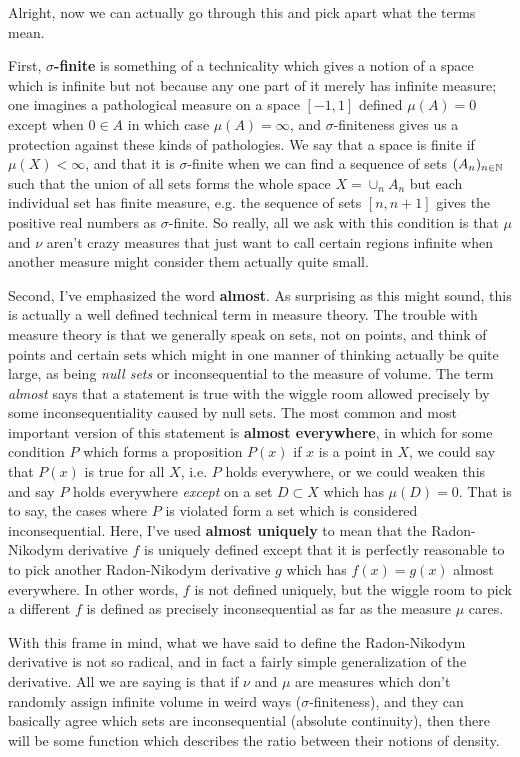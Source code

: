 \documentclass[11pt]{article}
\begin{document}
Alright, now we can actually go through this and pick apart what the terms mean.

First, $\sigma$\textbf{-finite} is something of a technicality which gives a notion of a space which is infinite but not because any one part of it merely has infinite measure; one imagines a pathological measure on a space $[-1,1]$ defined $\mu(A) = 0$ except when $0 \in A$ in which case $\mu(A) = \infty$, and $\sigma$-finiteness gives us a protection against these kinds of pathologies. We say that a space is finite if $\mu(X) < \infty$, and that it is $\sigma$-finite when we can find a sequence of sets $(A_n)_{n \in \mathbb{N}}$ such that the union of all sets forms the whole space $X = \cup_n A_n$ but each individual set has finite measure, e.g. the sequence of sets $[n,n+1]$ gives the positive real numbers as $\sigma$-finite. So really, all we ask with this condition is that $\mu$ and $\nu$ aren't crazy measures that just want to call certain regions infinite when another measure might consider them actually quite small.

Second, I've emphasized the word \textbf{almost}. As surprising as this might sound, this is actually a well defined technical term in measure theory. The trouble with measure theory is that we generally speak on sets, not on points, and think of points and certain sets which might in one manner of thinking actually be quite large, as being \emph{null sets} or inconsequential to the measure of volume. The term \emph{almost} says that a statement is true with the wiggle room allowed precisely by some inconsequentiality caused by null sets. The most common and most important version of this statement is \textbf{almost everywhere}, in which for some condition $P$ which forms a proposition $P(x)$ if $x$ is a point in $X$, we could say that $P(x)$ is true for all $X$, i.e. $P$ holds everywhere, or we could weaken this and say $P$ holds everywhere \emph{except} on a set $D \subset X$ which has $\mu(D) = 0$. That is to say, the cases where $P$ is violated form a set which is considered inconsequential. Here, I've used \textbf{almost uniquely} to mean that the Radon-Nikodym derivative $f$ is uniquely defined except that it is perfectly reasonable to to pick another Radon-Nikodym derivative $g$ which has $f(x) = g(x)$ almost everywhere. In other words, $f$ is not defined uniquely, but the wiggle room to pick a different $f$ is defined as precisely inconsequential as far as the measure $\mu$ cares.

With this frame in mind, what we have said to define the Radon-Nikodym derivative is not so radical, and in fact a fairly simple generalization of the derivative. All we are saying is that if $\nu$ and $\mu$ are measures which don't randomly assign infinite volume in weird ways ($\sigma$-finiteness), and they can basically agree which sets are inconsequential (absolute continuity), then there will be some function which describes the ratio between their notions of density.
\end{document}
